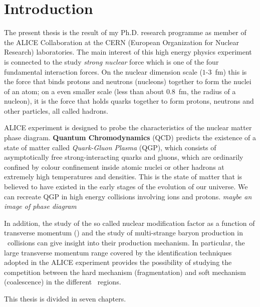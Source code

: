 \clearpage
{}
\chapter*{Introduction}
The present thesis is the result of my Ph.D. research programme as member of the ALICE Collaboration at the CERN (European Organization for Nuclear Research) laboratories. The main interest of this high energy physics experiment is connected to the study \textit{strong nuclear} force which is one of the four fundamental interaction forces. On the nuclear dimension scale (\mbox{$1$-$3$ fm}) this is the force that binds protons and neutrons (nucleons) together to form the nuclei of an atom; on a even smaller scale (less than about \mbox{$0.8$ fm}, the radius of a nucleon), it is the force that holds quarks together to form protons, neutrons and other particles, all called hadrons. 


ALICE experiment is designed to probe the characteristics of the nuclear matter phase diagram. \textbf{Quantum Chromodynamics} (QCD) predicts the existence of a state of matter called \emph{Quark-Gluon Plasma} (QGP),  which consists of asymptotically free strong-interacting quarks and gluons, which are ordinarily confined by colour confinement inside atomic nuclei or other hadrons at extremely high temperatures and densities. This is the state of matter that is believed to have existed in the early stages of the evolution of our universe. We can recreate QGP in high energy collisions involving ions and protons. \textit{maybe an image of phase diagram}




In addition, the study of the so called nuclear modification factor as a function of transverse momentum (\pT) and the study of multi-strange baryon production in \pp\ collisions can give insight into their production mechanism. In particular, the large transverse momentum range covered by the identification techniques adopted in the ALICE experiment provides the possibility of studying the competition between the hard mechanism (fragmentation) and soft mechanism (coalescence) in the different \pT\ regions.

This thesis is divided in seven chapters. 

